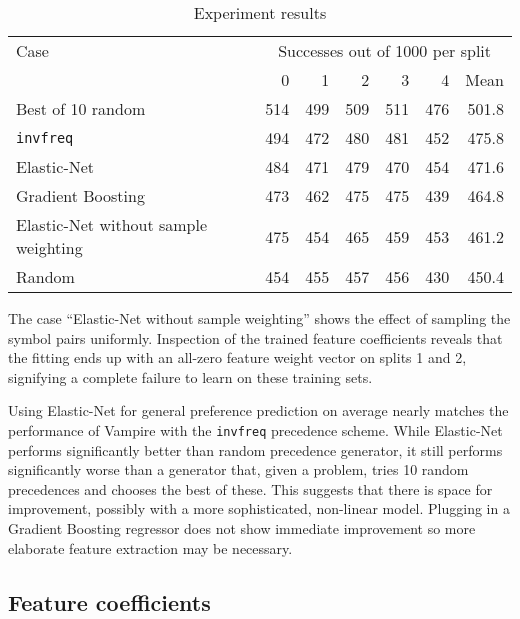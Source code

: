 \begin{table}[ht]
	\centering
	\begin{tabular}{l|rrrrr|r}
		Case & \multicolumn{6}{c}{Successes out of 1000 per split} \\
		& 0 & 1 & 2 & 3 & 4 & Mean \\
		\hline
		Best of 10 random & 514 & 499 & 509 & 511 & 476 & 501.8 \\
		\texttt{invfreq} & 494 & 472 & 480 & 481 & 452 & 475.8 \\
		Elastic-Net & 484 & 471 & 479 & 470 & 454 & 471.6 \\
		Gradient Boosting & 473 & 462 & 475 & 475 & 439 & 464.8 \\
		Elastic-Net without sample weighting & 475 & 454 & 465 & 459 & 453 & 461.2 \\
		Random & 454 & 455 & 457 & 456 & 430 & 450.4 \\
	\end{tabular}
	\caption{Experiment results}
	\label{table:results}
\end{table}

The case ``Elastic-Net without sample weighting'' shows the effect of
sampling the symbol pairs uniformly.
Inspection of the trained feature coefficients reveals that the fitting ends up
with an all-zero feature weight vector on splits 1 and 2,
signifying a complete failure to learn on these training sets.

Using Elastic-Net for general preference prediction on average nearly matches the performance
of Vampire with the \texttt{invfreq} precedence scheme.
While Elastic-Net performs significantly better than random precedence generator,
it still performs significantly worse than a generator
that, given a problem, tries 10 random precedences and chooses the best of these.
This suggests that there is space for improvement, possibly with a more sophisticated, non-linear model.
Plugging in a Gradient Boosting regressor does not show immediate improvement
so more elaborate feature extraction may be necessary.


\subsection{Feature coefficients}

